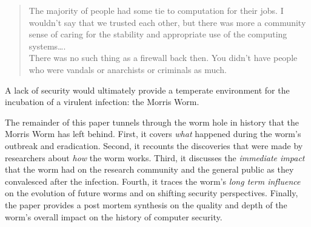 \begin{quote}
The majority of people had some tie to computation for their jobs. I wouldn't
say that we trusted each other, but there was more a community sense of caring
for the stability and appropriate use of the computing systems\ldots. \\
There was no such thing as a firewall back then. You didn't have people who were
vandals or anarchists or criminals as much. 
\end{quote}

A lack of
security would ultimately provide a temperate environment for the incubation of
a virulent infection: the Morris Worm.

The remainder of this
paper tunnels through the worm hole in history that the Morris Worm
has left behind. First, it covers \textit{what} happened during the worm's
outbreak and eradication. Second, it recounts the discoveries that were made
by researchers about \textit{how} the worm works. Third,
it discusses the \textit{immediate impact} that the worm had on the research
community and the general public as they convalesced after the infection.
Fourth, it traces the worm's \textit{long term influence} on the evolution of future
worms and on shifting security perspectives. Finally, the paper
provides a post mortem synthesis on the quality and depth of the worm's overall
impact on the history of computer security. 
